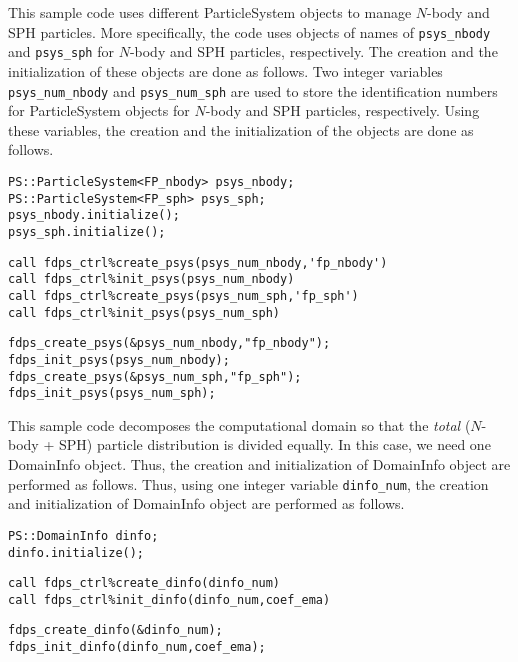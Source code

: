 This sample code uses different \textsf{ParticleSystem} objects to manage $N$-body and SPH particles.
\ifCpp %
More specifically, the code uses objects of names of \texttt{psys\_nbody} and \texttt{psys\_sph} for $N$-body and SPH particles, respectively. The creation and the initialization of these objects are done as follows.
\endifCpp
\ifIF %
Two integer variables \texttt{psys\_num\_nbody} and \texttt{psys\_num\_sph} are used to store the identification numbers for \textsf{ParticleSystem} objects for $N$-body and SPH particles, respectively. Using these variables, the creation and the initialization of the objects are done as follows.
\endifIF
\ifCpp %
\begin{lstlisting}[caption=Creation and initialization of \textsf{ParticleSystem} objects]
PS::ParticleSystem<FP_nbody> psys_nbody;
PS::ParticleSystem<FP_sph> psys_sph;
psys_nbody.initialize();
psys_sph.initialize();
\end{lstlisting}
\endifCpp
\ifFtn %
\begin{lstlisting}[caption=Creation and initialization of \textsf{ParticleSystem} objects]
call fdps_ctrl%create_psys(psys_num_nbody,'fp_nbody')
call fdps_ctrl%init_psys(psys_num_nbody)
call fdps_ctrl%create_psys(psys_num_sph,'fp_sph')
call fdps_ctrl%init_psys(psys_num_sph)
\end{lstlisting}
\endifFtn
\ifC %
\begin{lstlisting}[caption=Creation and initialization of \textsf{ParticleSystem} objects]
fdps_create_psys(&psys_num_nbody,"fp_nbody");
fdps_init_psys(psys_num_nbody);
fdps_create_psys(&psys_num_sph,"fp_sph");
fdps_init_psys(psys_num_sph);
\end{lstlisting}
\endifC

This sample code decomposes the computational domain so that the \textit{total} ($N$-body + SPH) particle distribution is divided equally. In this case, we need one \textsf{DomainInfo} object. 
\ifCpp %
Thus, the creation and initialization of \textsf{DomainInfo} object are performed as follows.
\endifCpp
\ifIF %
Thus, using one integer variable \texttt{dinfo\_num}, the creation and initialization of \textsf{DomainInfo} object are performed as follows.
\endifIF
\ifCpp %
\begin{lstlisting}[caption=Creation and initialization of \textsf{DomainInfo} object]
PS::DomainInfo dinfo;
dinfo.initialize();
\end{lstlisting}
\endifCpp
\ifFtn %
\begin{lstlisting}[caption=Creation and initialization of \textsf{DomainInfo} object]
call fdps_ctrl%create_dinfo(dinfo_num)
call fdps_ctrl%init_dinfo(dinfo_num,coef_ema)
\end{lstlisting}
\endifFtn
\ifC %
\begin{lstlisting}[caption=Creation and initialization of \textsf{DomainInfo} object]
fdps_create_dinfo(&dinfo_num);
fdps_init_dinfo(dinfo_num,coef_ema);
\end{lstlisting}
\endifC


